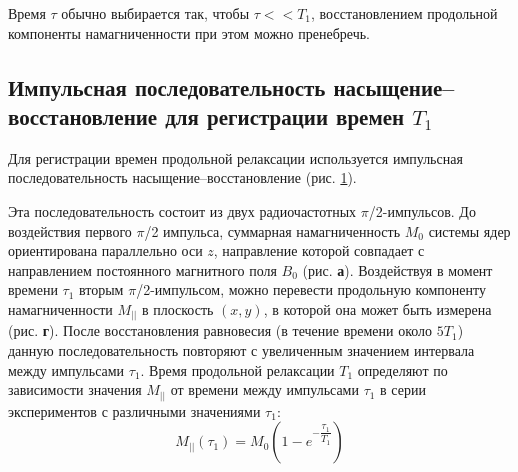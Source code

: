 Время $\tau$ обычно выбирается так, чтобы $\tau << T_1$, восстановлением продольной компоненты намагниченности при этом можно пренебречь. 

\subsection{Импульсная последовательность насыщение–восстановление для регистрации времен $T_1$ }
Для регистрации времен продольной релаксации используется импульсная последовательность насыщение–восстановление (рис. \ref{fig:2019-02-111}).
\begin{figure}
	\centering
	\caption{}
	\label{fig:2019-02-111}
\end{figure}
Эта последовательность состоит из двух радиочастотных $\pi$/2-импульсов. 
До воздействия первого $\pi$/2 импульса, суммарная намагниченность $M_0$ системы ядер ориентирована параллельно оси $z$, направление которой совпадает с направлением постоянного магнитного поля $B_0$ (рис. \textbf{а}). 
Воздействуя в момент времени $\tau_1$ вторым $\pi$/2-импульсом, можно перевести продольную компоненту намагниченности $M_{||}$ в плоскость $(x, y)$, в которой она может быть измерена (рис. \textbf{г}).
После восстановления равновесия (в течение времени около $5T_1$) данную последовательность повторяют с увеличенным значением интервала между импульсами $\tau_1$. 
Время продольной релаксации $T_1$ определяют по зависимости значения $M_{||}$ от времени между импульсами $\tau_1$ в серии экспериментов с различными значениями $\tau_1$: 
\begin{equation}
\label{eq:T1-def}
M_{||}(\tau_1)= M_0 \left(1-e^{-\dfrac{\tau_1}{T_1}} \right)
\end{equation}